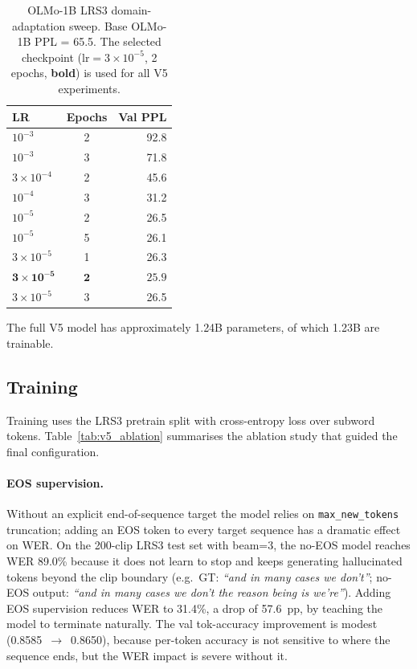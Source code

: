 \documentclass{article}
\begin{document}
\begin{table}[h]
\centering
\small
\begin{tabular}{@{}lcr@{}}
\toprule
\textbf{LR} & \textbf{Epochs} & \textbf{Val PPL} \\
\midrule
$10^{-3}$         & 2 & 92.8 \\
$10^{-3}$         & 3 & 71.8 \\
$3\times10^{-4}$  & 2 & 45.6 \\
$10^{-4}$         & 3 & 31.2 \\
$10^{-5}$         & 2 & 26.5 \\
$10^{-5}$         & 5 & 26.1 \\
$3\times10^{-5}$  & 1 & 26.3 \\
$\mathbf{3\times10^{-5}}$ & $\mathbf{2}$ & $\mathbf{25.9}$ \\
$3\times10^{-5}$  & 3 & 26.5 \\
\bottomrule
\end{tabular}
\caption{OLMo-1B LRS3 domain-adaptation sweep. Base OLMo-1B PPL = 65.5.
The selected checkpoint ($\text{lr}=3\times10^{-5}$, 2 epochs, \textbf{bold})
is used for all V5 experiments.}
\label{tab:olmo_lm_sweep}
\end{table}

The full V5 model has approximately 1.24B parameters, of which 1.23B are
trainable.

\subsection{Training}

Training uses the LRS3 pretrain split with cross-entropy loss over
subword tokens.
Table~\ref{tab:v5_ablation} summarises the ablation study that guided the
final configuration.

\paragraph{EOS supervision.}
Without an explicit end-of-sequence target the model relies on
\texttt{max\_new\_tokens} truncation; adding an EOS token to every target
sequence has a dramatic effect on WER.
On the 200-clip LRS3 test set with beam=3, the no-EOS model reaches WER
89.0\% because it does not learn to stop and keeps generating hallucinated
tokens beyond the clip boundary (e.g.\ GT: \textit{``and in many cases we don't''};
no-EOS output: \textit{``and in many cases we don't the reason being is we're''}).
Adding EOS supervision reduces WER to 31.4\%, a drop of 57.6~pp,
by teaching the model to terminate naturally.
The val tok-accuracy improvement is modest (0.8585~$\to$~0.8650), because
per-token accuracy is not sensitive to where the sequence ends, but the
WER impact is severe without it.
\end{document}
